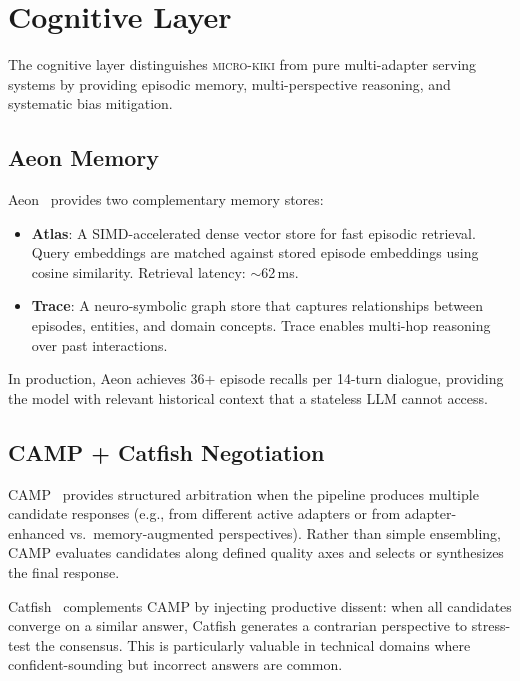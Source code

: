 \documentclass[11pt,a4paper]{article}
\begin{document}
\section{Cognitive Layer}
\label{sec:cognitive}

The cognitive layer distinguishes \textsc{micro-kiki} from pure multi-adapter serving systems by providing episodic memory, multi-perspective reasoning, and systematic bias mitigation.

\subsection{Aeon Memory}

Aeon~\citep{aeon2025} provides two complementary memory stores:

\begin{itemize}[nosep]
  \item \textbf{Atlas}: A SIMD-accelerated dense vector store for fast episodic retrieval. Query embeddings are matched against stored episode embeddings using cosine similarity. Retrieval latency: $\sim$62\,ms.
  \item \textbf{Trace}: A neuro-symbolic graph store that captures relationships between episodes, entities, and domain concepts. Trace enables multi-hop reasoning over past interactions.
\end{itemize}

In production, Aeon achieves 36+ episode recalls per 14-turn dialogue, providing the model with relevant historical context that a stateless LLM cannot access.

\subsection{CAMP + Catfish Negotiation}

CAMP~\citep{camp2026} provides structured arbitration when the pipeline produces multiple candidate responses (e.g., from different active adapters or from adapter-enhanced vs.\ memory-augmented perspectives). Rather than simple ensembling, CAMP evaluates candidates along defined quality axes and selects or synthesizes the final response.

Catfish~\citep{catfish2025} complements CAMP by injecting productive dissent: when all candidates converge on a similar answer, Catfish generates a contrarian perspective to stress-test the consensus. This is particularly valuable in technical domains where confident-sounding but incorrect answers are common.
\end{document}
